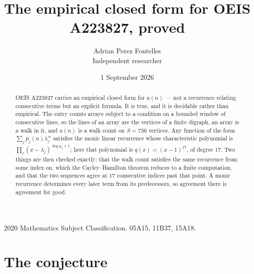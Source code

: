 \documentclass[11pt,a4paper]{article}
\title{The empirical closed form for OEIS A223827, proved}
\author{Adrian Perez Fontelles\\ \small Independent researcher}
\date{1 September 2026}
\theoremstyle{plain}
\theoremstyle{definition}
\begin{document}
\maketitle

\begin{abstract}
OEIS A223827 carries an empirical closed form for $a(n)$ --- not a recurrence relating
consecutive terms but an explicit formula. It is true, and it is decidable rather than
empirical. The entry counts arrays subject to a condition on a bounded window of consecutive lines, so the lines of an array are the
vertices of a finite digraph, an array is a walk in it, and $a(n)$ is a walk count on
$S=736$ vertices. Any function of the form $\sum_j p_j(n)\lambda_j^{\,n}$ satisfies the
monic linear recurrence whose characteristic polynomial is
$\prod_j(x-\lambda_j)^{\deg p_j+1}$; here that polynomial is $q(x)=(x-1)^{17}$, of degree
$17$. Two things are then checked exactly: that the walk count satisfies the same
recurrence from some index on, which the Cayley--Hamilton theorem reduces to a finite
computation, and that the two sequences agree at $17$ consecutive indices past that
point. A monic recurrence determines every later term from its predecessors, so agreement
there is agreement for good.
\end{abstract}

\noindent\small 2020 Mathematics Subject Classification. 05A15, 11B37, 15A18.\normalsize

\section{The conjecture}
\end{document}
